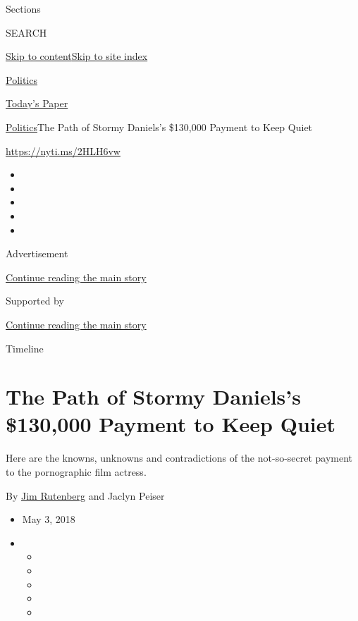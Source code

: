 Sections

SEARCH

\protect\hyperlink{site-content}{Skip to
content}\protect\hyperlink{site-index}{Skip to site index}

\href{https://www.nytimes3xbfgragh.onion/section/politics}{Politics}

\href{https://myaccount.nytimes3xbfgragh.onion/auth/login?response_type=cookie\&client_id=vi}{}

\href{https://www.nytimes3xbfgragh.onion/section/todayspaper}{Today's
Paper}

\href{/section/politics}{Politics}\textbar{}The Path of Stormy Daniels's
\$130,000 Payment to Keep Quiet

\url{https://nyti.ms/2HLH6vw}

\begin{itemize}
\item
\item
\item
\item
\item
\end{itemize}

Advertisement

\protect\hyperlink{after-top}{Continue reading the main story}

Supported by

\protect\hyperlink{after-sponsor}{Continue reading the main story}

Timeline

\hypertarget{the-path-of-stormy-danielss-130000-payment-to-keep-quiet}{%
\section{The Path of Stormy Daniels's \$130,000 Payment to Keep
Quiet}\label{the-path-of-stormy-danielss-130000-payment-to-keep-quiet}}

Here are the knowns, unknowns and contradictions of the not-so-secret
payment to the pornographic film actress.

By \href{http://www.nytimes3xbfgragh.onion/by/jim-rutenberg}{Jim
Rutenberg} and Jaclyn Peiser

\begin{itemize}
\item
  May 3, 2018
\item
  \begin{itemize}
  \item
  \item
  \item
  \item
  \item
  \end{itemize}
\end{itemize}

